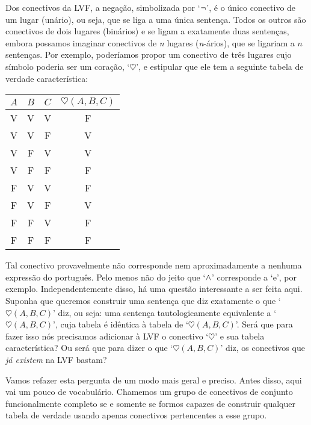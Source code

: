 
Dos conectivos da LVF, a negação, simbolizada por `$\neg$', é o único conectivo de um lugar (unário), ou seja, que se liga a uma única sentença. Todos os outros são conectivos de dois lugares (binários) e se ligam a exatamente duas sentenças, embora possamos imaginar conectivos de \textit{n} lugares (\textit{n}-ários), que se ligariam a $n$ sentenças. Por exemplo, poderíamos propor um conectivo de três lugares cujo símbolo poderia ser um coração, `$\heartsuit$', e estipular que ele tem a seguinte tabela de verdade característica:

\begin{center}
\begin{tabular}{c c c | c}
$A$ & $B$ & $C$ & $\heartsuit(A,B,C)$\\
\hline
 V & V & V & F \\
 V & V & F & V \\
 V & F & V & V \\
 V & F & F & F \\
 F & V & V & F \\
 F & V & F & V \\
 F & F & V & F \\
 F & F & F & F
\end{tabular}
\end{center}
Tal conectivo provavelmente não corresponde nem aproximadamente a nenhuma expressão do português. Pelo menos não do jeito que `$\wedge$' corresponde a `e', por exemplo. Independentemente disso, há uma questão interessante a ser feita aqui. Suponha que queremos construir uma sentença que diz exatamente o que `$\heartsuit(A,B,C)$' diz, ou seja: uma sentença tautologicamente equivalente a `$\heartsuit(A,B,C)$', cuja tabela é idêntica à tabela de `$\heartsuit(A,B,C)$'.
Será que para fazer isso nós precisamos adicionar à LVF o conectivo `$\heartsuit$' e sua tabela característica?
Ou será que para dizer o que `$\heartsuit(A,B,C)$' diz, os conectivos que \emph{já existem} na LVF bastam?

Vamos refazer esta pergunta de um modo mais geral e preciso. Antes disso, aqui vai um pouco de vocabulário. Chamemos um grupo de conectivos de conjunto funcionalmente completo se e somente se formos capazes de construir qualquer tabela de verdade usando apenas conectivos pertencentes a esse grupo.

